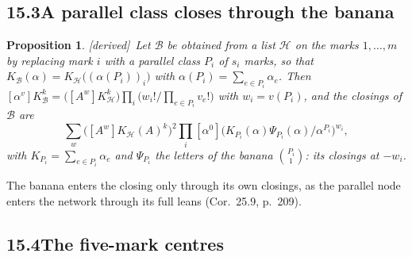 \documentclass[11pt]{article}
\newcommand{\cB}{\mathcal B}
\newcommand{\cH}{\mathcal H}
\theoremstyle{plain}
\newtheorem{proposition}{Proposition}[section]
\theoremstyle{definition}
\theoremstyle{remark}
\newcommand{\derived}{\textup{[derived]}}
\begin{document}
\subsection*{15.3\quad A parallel class closes through the banana}

\begin{proposition}\label{p:parallel}\derived\
Let $\cB$ be obtained from a list $\cH$ on the marks $1,\dots,m$ by replacing mark $i$ with a parallel class $P_i$ of $s_i$ marks, so that $K_{\cB}(\alpha)=K_{\cH}\big((\alpha(P_i))_i\big)$ with $\alpha(P_i)=\sum_{e\in P_i}\alpha_e$. Then $[\alpha^v]K_{\cB}^k=\big([A^w]K_{\cH}^k\big)\prod_i\big(w_i!/\prod_{e\in P_i}v_e!\big)$ with $w_i=v(P_i)$, and the closings of $\cB$ are
\[
\sum_w\big([A^w]K_{\cH}(A)^k\big)^2\prod_i[\alpha^0]\Big(K_{P_i}(\alpha)\Psi_{P_i}(\alpha)/\alpha^{P_i}\Big)^{w_i},
\]
with $K_{P_i}=\sum_{e\in P_i}\alpha_e$ and $\Psi_{P_i}$ the letters of the banana $\binom{P_i}1$: its closings at $-w_i$.
\end{proposition}

The banana enters the closing only through its own closings, as the parallel node enters the network through its full leans (Cor.~25.9, p.~209).

\subsection*{15.4\quad The five-mark centres}
\end{document}
